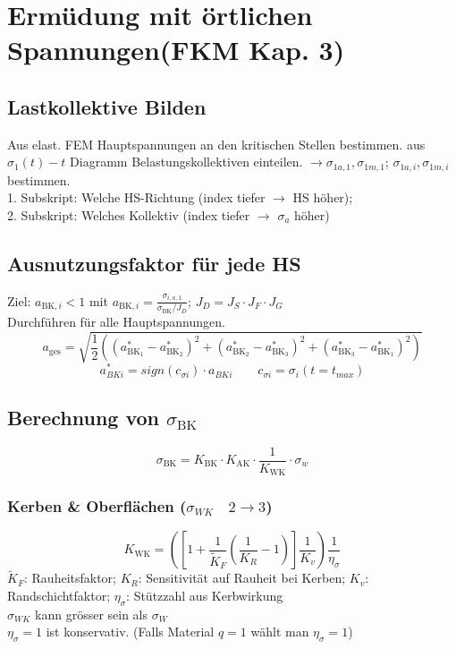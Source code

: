 \section{Ermüdung mit örtlichen Spannungen(FKM Kap. 3)}
    \subsection{Lastkollektive Bilden}
    Aus elast. FEM Hauptspannungen an den kritischen Stellen bestimmen.
    aus $\sigma_1(t)-t$ Diagramm Belastungskollektiven einteilen. $\rightarrow \sigma_{1a,1}, \sigma_{1m,1}$; $\sigma_{1a,i}, \sigma_{1m,i}$ bestimmen.
    \\1. Subskript: Welche HS-Richtung (index tiefer $\rightarrow$ HS höher); 
    \\2. Subskript: Welches Kollektiv (index tiefer $\rightarrow$ $\sigma_a$ höher)
    \subsection{Ausnutzungsfaktor für jede HS}
        Ziel: $a_{\textrm{BK},i} < 1$ mit $\displaystyle a_{\textrm{BK},i} = \frac{\sigma_{i,a,1}}{\sigma_{\textrm{BK}}/J_D}$; \quad $J_D=J_S\cdot J_F \cdot J_G$ 
        \\Durchführen für alle Hauptspannungen.
        \[a_{\textrm{ges}}=\sqrt{\frac{1}{2}\left((a_{\textrm{BK}_1}^{*}-a_{\textrm{BK}_2}^{*})^{2}+(a_{\textrm{BK}_2}^{*}-a_{\textrm{BK}_3}^{*})^{2}+(a_{\textrm{BK}_3}^{*}-a_{\textrm{BK}_1}^{*})^{2}\right)}\]
        \[a_{BKi}^*=sign(c_{\sigma i})\cdot a_{BKi} \qquad c_{\sigma i}= \sigma_i(t=t_{max})\]
    \subsection{Berechnung von $\sigma_{\textrm{BK}}$}
        \[\boxed{\sigma_{\textrm{BK}} = K_{\textrm{BK}} \cdot K_{\textrm{AK}} \cdot \frac{1}{K_{\textrm{WK}}} \cdot \sigma_w }\]
        \subsubsection{Kerben \& Oberflächen ($\sigma_{WK}\quad2\rightarrow3$)}
            \[\boxed{K_{\textrm{WK}}=\left(\left[1+\frac{1}{\widetilde{K}_F}\left(\frac{1}{K_R}-1\right)\right]\frac{1}{K_v}\right)\frac{1}{\eta_{\sigma}}}\]
            $\widetilde{K}_F$: Rauheitsfaktor;   $K_R$: Sensitivität auf Rauheit bei Kerben;     $K_v$: Randschichtfaktor;   $\eta_{\sigma}$: Stützzahl aus Kerbwirkung
            \\$\sigma_{WK}$ kann grösser sein als $\sigma_W$
            \\$\eta_{\sigma}=1$ ist konservativ. (Falls Material $q=1$ wählt man $\eta_{\sigma}=1$)
